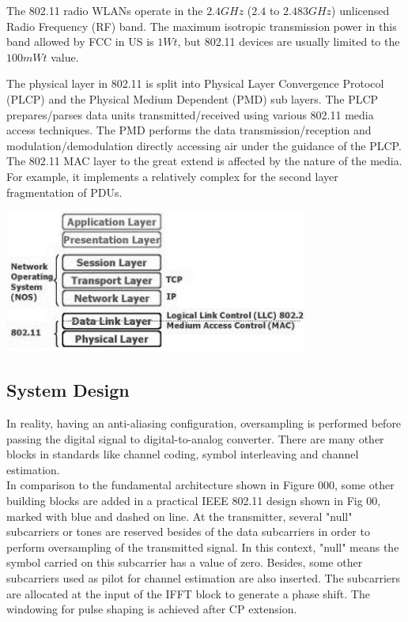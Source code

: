 The 802.11 radio WLANs operate in the $2.4 GHz$ ($2.4$ to $2.483 GHz$) unlicensed Radio Frequency (RF) band. The maximum isotropic transmission power in this band allowed by FCC in US is $1 Wt$, but 802.11 devices are usually limited to the $100 mWt$ value.

The physical layer in 802.11 is split into Physical Layer Convergence Protocol (PLCP) and the Physical Medium Dependent (PMD) sub layers. The PLCP prepares/parses data units transmitted/received using various 802.11 media access techniques. The PMD performs the data transmission/reception and modulation/demodulation directly accessing air under the guidance of the PLCP. The 802.11 MAC layer to the great extend is affected by the nature of the media. For example, it implements a relatively complex for the second layer fragmentation of PDUs.\\

\begin{center}
\includegraphics[width=10cm]{content/fig/osi.JPG}
\end{center}

\subsection{System Design}

In reality, having an anti-aliasing configuration, oversampling is performed before passing the digital signal to digital-to-analog converter. There are many other blocks in standards like channel coding, symbol interleaving and channel estimation.\\
In comparison to the fundamental architecture shown in Figure 000, some other building blocks are added in a practical IEEE 802.11 design shown in Fig 00, marked with blue and dashed on line. At the transmitter, several "null" subcarriers or tones are reserved besides of the data subcarriers in order to perform oversampling of the transmitted signal. In this context, "null" means the symbol carried on this subcarrier has a value of zero. Besides, some other subcarriers used as pilot for channel estimation are also inserted. The subcarriers are allocated at the input of the IFFT block to generate a phase shift. The windowing for pulse shaping is achieved after CP extension.\\

